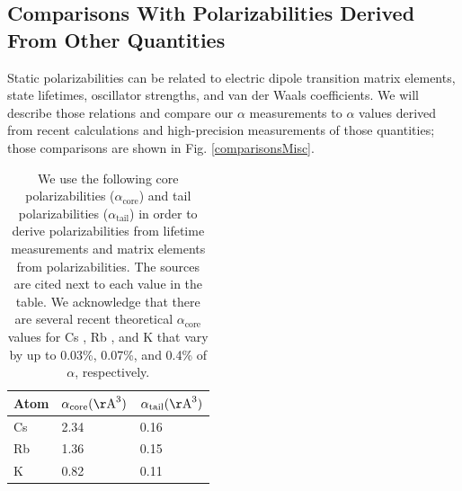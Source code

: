 \documentclass[twocolumn,prl,showpacs,superscriptaddress]{revtex4-1}   %
\newcommand{\figref}[1]{Fig. \ref{#1}}
\newcommand{\acore}{\alpha_{\textrm{core}}}
\newcommand{\atail}{\alpha_{\textrm{tail}}}
\newcommand{\AAA}{\mathrm{\AA}}
\begin{document}
\subsection{Comparisons With Polarizabilities Derived From Other Quantities}

Static polarizabilities can be related to electric dipole transition matrix elements, state lifetimes, oscillator strengths, and van der Waals coefficients. We will describe those relations and compare our $\alpha$ measurements to $\alpha$ values derived from recent calculations and high-precision measurements of those quantities; those comparisons are shown in \figref{comparisonsMisc}.

\begingroup
\begin{table}
\caption{\label{tableCoreTail}We use the following core polarizabilities ($\acore$) and tail polarizabilities ($\atail$) in order to derive polarizabilities from lifetime measurements and matrix elements from polarizabilities. The sources are cited next to each value in the table. We acknowledge that there are several recent theoretical $\acore$ values for 
Cs \cite{Sansonetti1981,Johnson1983,Safronova1999,Derevianko2001}, 
Rb \cite{Johnson1983,Safronova1999}, and 
K \cite{Johnson1983,Muller1984}
that vary by up to 0.03\%, 0.07\%, and 0.4\% of $\alpha$, respectively.}
\begin{center}
\begin{tabular}{l l l}
\hline\hline
Atom & $\acore (\AAA^3)$ & $\atail (\AAA^3)$ \\
\hline
Cs & 2.34 \cite{Lim2002} & 0.16 \cite{Derevianko2001} \\
Rb & 1.36 \cite{Lim2002} & 0.15 \cite{Safronova2011} \\
K  & 0.82 \cite{Lim2002} & 0.11 \cite{Sahoo2013} \\
\hline\hline
\end{tabular}
\end{center}
\end{table}
\endgroup
\end{document}
